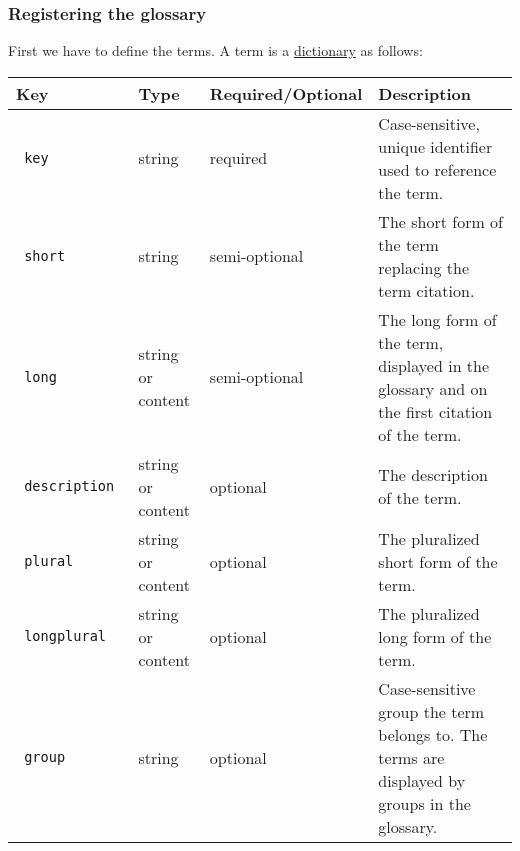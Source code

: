 \subsubsection{Registering the glossary}\label{registering-the-glossary}

First we have to define the terms. A term is a
\href{https://typst.app/docs/reference/types/dictionary/}{dictionary} as
follows:

\begin{longtable}[]{@{}llll@{}}
\toprule\noalign{}
Key & Type & Required/Optional & Description \\
\midrule\noalign{}
\endhead
\bottomrule\noalign{}
\endlastfoot
\texttt{\ key\ } & string & required & Case-sensitive, unique identifier
used to reference the term. \\
\texttt{\ short\ } & string & semi-optional & The short form of the term
replacing the term citation. \\
\texttt{\ long\ } & string or content & semi-optional & The long form of
the term, displayed in the glossary and on the first citation of the
term. \\
\texttt{\ description\ } & string or content & optional & The
description of the term. \\
\texttt{\ plural\ } & string or content & optional & The pluralized
short form of the term. \\
\texttt{\ longplural\ } & string or content & optional & The pluralized
long form of the term. \\
\texttt{\ group\ } & string & optional & Case-sensitive group the term
belongs to. The terms are displayed by groups in the glossary. \\
\end{longtable}


